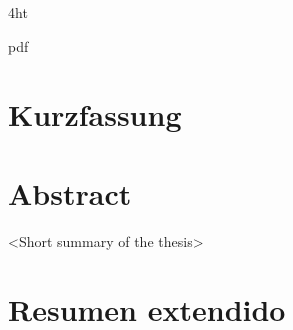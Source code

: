 \documentclass[
  fontsize=12pt,
  a4paper,  %
  twoside,  %
  bibliography=totoc,
  headsepline,
  cleardoublepage=empty,
  draft=false
]{scrbook}
\theoremstyle{nonumberplain}
\begin{document}

\frontmatter
\iftex4ht
  \Configure{$}{\PicMath}{\EndPicMath}{}

  {pdf}
  {%
  }
\fi


\Coverpage

\setlength{\parindent}{1.5em}
\linespread{1.1}

\pagestyle{empty}
\renewcommand*{\chapterpagestyle}{empty}
\pagebreak
\hspace{0pt}
\vfill
\begin{center}
    \begin{minipage}[t]{12.5cm}
        \doclicenseThis
    \end{minipage}
\end{center}
\vfill
\hspace{0pt}
\pagebreak
\cleardoublepage


\pagestyle{preamble}
\renewcommand*{\chapterpagestyle}{preamble}



\ifdeutsch
  \section*{Kurzfassung}
\else
  \section*{Abstract}
\fi

<Short summary of the thesis>

\cleardoublepage

\section*{Resumen extendido}
\end{document}
